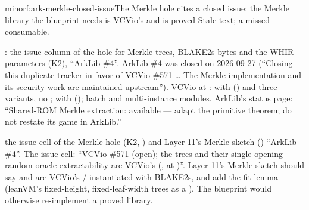 \begin{finding}{minor}{f:ark-merkle-closed-issue}{The Merkle hole cites a closed issue; the Merkle library the blueprint needs is VCVio's and is proved}
 Stale text; a missed consumable.

 : the issue column of the hole for Merkle trees, BLAKE2s bytes and
the WHIR parameters (K2), ``ArkLib \#4''. ArkLib \#4 was closed on 2026-09-27 (``Closing this
duplicate tracker in favor of VCVio \#571 \ldots{} The Merkle implementation and its security
work are maintained upstream''). VCVio at :
 with 
() and three variants, no ;  with
 (); batch and multi-instance modules. ArkLib's
status page: ``Shared-ROM Merkle extraction: available --- adapt the primitive theorem; do not
restate its game in ArkLib.''

\begin{change}{the issue cell of the Merkle hole (K2, ) and Layer 11's Merkle sketch ()}
\asis ``ArkLib \#4''.
\asproposed The issue cell: ``VCVio \#571 (open); the trees and their single-opening
random-oracle extractability are VCVio's (,
 at )''. Layer 11's Merkle sketch should say
 and  are VCVio's / instantiated with
BLAKE2s, and add the fit lemma (leanVM's fixed-height, fixed-leaf-width trees as a
).
\reason The blueprint would otherwise re-implement a proved library.
\end{change}
\end{finding}

